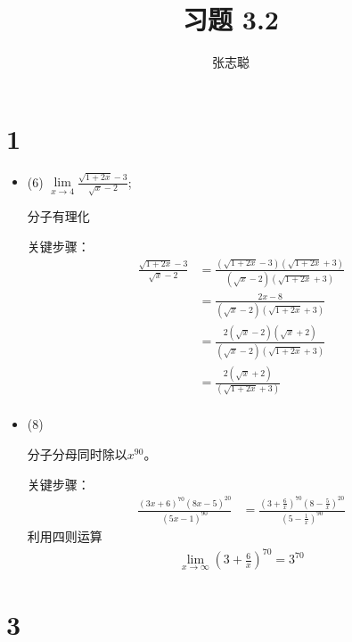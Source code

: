 \documentclass{article}
\begin{document}
\title{习题 3.2}
\author{张志聪}
\maketitle

\section*{1}

\begin{itemize}
  \item (6) $\lim\limits_{x \to 4} \frac{\sqrt{1 + 2x} - 3}{\sqrt{x} - 2}$;

        分子有理化

        关键步骤：
        \begin{align*}
          \frac{\sqrt{1 + 2x} - 3}{\sqrt{x} - 2}
           & = \frac{(\sqrt{1 + 2x} - 3)(\sqrt{1 + 2x} + 3)}{(\sqrt{x} - 2)(\sqrt{1 + 2x} + 3)} \\
           & = \frac{2x - 8}{(\sqrt{x} - 2)(\sqrt{1 + 2x} + 3)}                                 \\
           & = \frac{2(\sqrt{x} - 2)(\sqrt{x} + 2)}{(\sqrt{x} - 2)(\sqrt{1 + 2x} + 3)}          \\
           & = \frac{2(\sqrt{x} + 2)}{(\sqrt{1 + 2x} + 3)}                                      \\
        \end{align*}

  \item (8)

        分子分母同时除以$x^{90}$。

        关键步骤：
        \begin{align*}
          \frac{(3x + 6)^{70}(8x - 5)^{20}}{(5x - 1)^{90}}
           & = \frac{(3 + \frac{6}{x})^{70}(8 - \frac{5}{x})^{20}}{(5 - \frac{1}{x})^{90}}
        \end{align*}
        利用四则运算
        \begin{align*}
          \lim\limits_{x \to \infty} (3 + \frac{6}{x})^{70} = 3^{70}
        \end{align*}
\end{itemize}

\section*{3}
\end{document}
